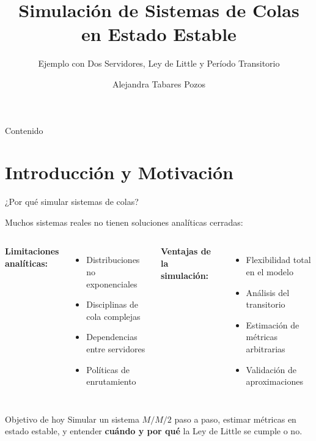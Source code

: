 \documentclass[aspectratio=1610, 9pt]{beamer}
\title[Simulación de Colas]{Simulación de Sistemas de Colas\\en Estado Estable}
\subtitle{Ejemplo con Dos Servidores, Ley de Little y Período Transitorio}
\author{Alejandra Tabares Pozos}
\institute{Universidad de los Andes \\
 Departamento de Ingeniería Industrial}
\date{}
\begin{document}
\begin{frame}
\titlepage
\end{frame}

\begin{frame}{Contenido}
\tableofcontents
\end{frame}

\section{Introducción y Motivación}

\begin{frame}{¿Por qué simular sistemas de colas?}

Muchos sistemas reales no tienen soluciones analíticas cerradas:

\vspace{0.3cm}
\begin{columns}
\textbf{Limitaciones analíticas:}
\begin{itemize}
    \item Distribuciones no exponenciales
    \item Disciplinas de cola complejas
    \item Dependencias entre servidores
    \item Políticas de enrutamiento
\end{itemize}

\textbf{Ventajas de la simulación:}
\begin{itemize}
    \item Flexibilidad total en el modelo
    \item Análisis del transitorio
    \item Estimación de métricas arbitrarias
    \item Validación de aproximaciones
\end{itemize}
\end{columns}

\vspace{0.5cm}
\begin{block}{Objetivo de hoy}
Simular un sistema $M/M/2$ paso a paso, estimar métricas en estado estable, y entender \textbf{cuándo y por qué} la Ley de Little se cumple o no.
\end{block}
\end{frame}
\end{document}
